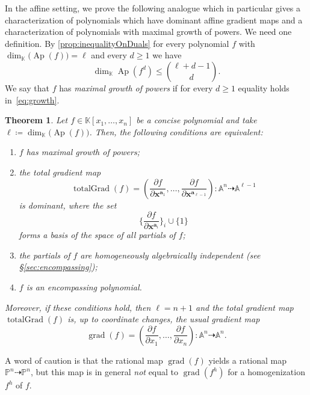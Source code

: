 \documentclass[a4paper,11pt,reqno]{amsart}
\newcommand{\bfa}{\mathbf{a}}
\newcommand{\bfx}{\mathbf{x}}
\newcommand{\bbK}{\mathbb{K}}
\newcommand{\dashto}{\dashrightarrow}
\DeclareMathOperator{\Ap}{Ap}
\numberwithin{equation}{section}
\theoremstyle{definition}
\theoremstyle{plain}
\newtheorem{teo}[defn]{Theorem}
\theoremstyle{remark}
\DeclareMathOperator{\grad}{grad}
\DeclareMathOperator{\totalgrad}{totalGrad}
\begin{document}
In the affine setting, we prove the following analogue which in
particular gives a characterization of polynomials which have dominant affine
gradient maps and a characterization of polynomials with maximal growth of
powers. We need one definition. By \autoref{prop:inequalityOnDuals} for every
polynomial $f$ with $\dim_{\bbK}\bigl(\Ap(f)\bigr)=\ell$ and every $d\geq 1$
we have
\begin{equation}\label{eq:growth}
\dim_{\bbK} \Ap(f^d) \leq \binom{\ell + d-1}{d}.
\end{equation}
We say that $f$ has \textit{maximal growth of powers} if for every $d\geq 1$ equality holds
in~\eqref{eq:growth}.
\begin{teo}\label{ref:intro:growth}
    Let $f\in \bbK[x_1, \ldots ,x_n]$ be a concise polynomial {and take $\ell \coloneq \dim_{\bbK}\bigl(\Ap(f)\bigr)$}. Then, the following conditions
    are equivalent:
    \begin{enumerate}[label=(\arabic*), left= 3pt, widest=2,nosep]
        \item\label{it:growthOne} $f$ has maximal growth of powers;
        \item\label{it:growthTwo} the \emph{total gradient} map
            \[
                \totalgrad(f) = \left( \frac{\partial f}{\partial \bfx^{\bfa_1}}, \ldots ,
                \frac{\partial f}{\partial \bfx^{\bfa_{\ell-1}}} \right)\colon
                \mathbb{A}^{n}\dashto
                \mathbb{A}^{\ell-1}
            \]
            is dominant, where the set
            \[ \biggl\{\frac{\partial f}{\partial
                \bfx^{\bfa_{i}}}\biggr\}_i\cup\{1\}\] forms a basis of the space of all
                partials of $f$;
        \item\label{it:growthThree} the partials of $f$ are homogeneously
            algebraically independent (see \S\ref{sec:encompassing});
        \item\label{it:growthFour} $f$ is an encompassing polynomial.
    \end{enumerate}
    Moreover, if these conditions hold, then $\ell = n+1$ and the {total} gradient map $\totalgrad(f)$
    is, up to coordinate changes, the usual gradient map
    \[
        \grad(f) = \left( \frac{\partial f}{\partial x_1}, \ldots ,
    \frac{\partial f}{\partial x_n} \right)\colon
    \mathbb{A}^n\dashto
    \mathbb{A}^n.
    \]
\end{teo}
A word of caution is that the rational map $\grad(f)$ yields a
rational map $\mathbb{P}^n\dashto \mathbb{P}^n$, but this map is in
general \emph{not} equal to $\grad(f^h)$ for a homogenization
$f^h$ of $f$.
\end{document}
